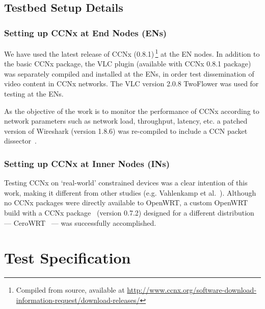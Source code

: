 \subsection{Testbed Setup Details}


\subsubsection{Setting up CCNx at End Nodes (ENs)}

We have used the latest release of CCNx (0.8.1)\,\footnote{Compiled from source, 
available at \url{http://www.ccnx.org/software-download-information-request/download-releases/}} at the EN nodes. 
In addition to the basic CCNx package, the VLC plugin (available with CCNx 0.8.1 package)
was separately compiled and installed at the ENs, in order test dissemination 
of video content in CCNx networks. The VLC version 2.0.8 TwoFlower was used 
for testing at the ENs.\vertbreak

As the objective of the work is to monitor the performance of CCNx according to 
network parameters such as network load, throughput, latency, etc. a patched 
version of Wireshark (version 1.8.6) was re-compiled to include a CCN packet 
dissector~\cite{website:ccn-wireshark}.

\subsubsection{Setting up CCNx at Inner Nodes (INs)}
\label{subsubsec:ccnx-openwrt}

Testing CCNx on `real-world' constrained devices was a clear 
intention of this work, making it different from other 
studies (e.g. Vahlenkamp et 
al.~\cite{Wahlisch2012, Vahlenkamp2012}). Although no CCNx packages were 
directly available to OpenWRT, a custom OpenWRT build with a CCNx 
package~\cite{website:ccn-openwrt} (version 0.7.2) designed for a different 
distribution --- CeroWRT~\cite{website:cerowrt} --- was successfully 
accomplished. 


\section{Test Specification}
\label{sec:protocol}

